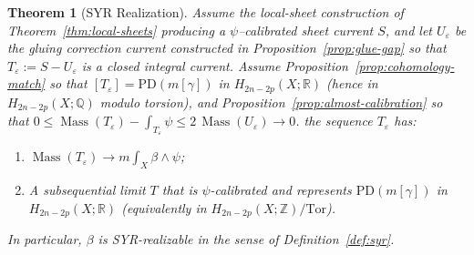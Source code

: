 \documentclass[11pt]{article}
\numberwithin{equation}{section}  %
\theoremstyle{plain}
\newtheorem{theorem}{Theorem}[section]
\theoremstyle{definition}
\theoremstyle{remark}
\newcommand{\R}{\mathbb{R}}
\newcommand{\Z}{\mathbb{Z}}
\newcommand{\Q}{\mathbb{Q}}
\DeclareMathOperator{\Mass}{Mass}
\begin{document}
\begin{theorem}[SYR Realization]\label{thm:syr-realization}
Assume the local-sheet construction of Theorem~\ref{thm:local-sheets} producing a $\psi$--calibrated sheet current $S$, and let $U_\varepsilon$ be the gluing correction current constructed in Proposition~\ref{prop:glue-gap} so that $T_\varepsilon:=S-U_\varepsilon$ is a closed integral current.  Assume Proposition~\ref{prop:cohomology-match} so that $[T_\varepsilon]=\mathrm{PD}(m[\gamma])$ in $H_{2n-2p}(X;\R)$ (hence in $H_{2n-2p}(X;\Q)$ modulo torsion), and Proposition~\ref{prop:almost-calibration} so that $0\le \Mass(T_\varepsilon)-\int_{T_\varepsilon}\psi\le 2\,\Mass(U_\varepsilon)\to 0$.
the sequence $T_\varepsilon$ has:
\begin{enumerate}
\item[\textnormal{(i)}] $\Mass(T_\varepsilon)\to m\int_X\beta\wedge\psi$;
\item[\textnormal{(ii)}] A subsequential limit $T$ that is $\psi$-calibrated
and represents $\mathrm{PD}(m[\gamma])$ in $H_{2n-2p}(X;\R)$ (equivalently in $H_{2n-2p}(X;\Z)/\mathrm{Tor}$).
\end{enumerate}
In particular, $\beta$ is SYR-realizable in the sense of Definition~\ref{def:syr}.
\end{theorem}
\end{document}
